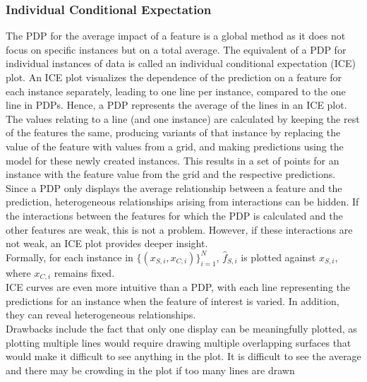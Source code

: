 \subsubsection*{Individual Conditional Expectation}
The PDP for the average impact of a feature is a global method as it does not focus on specific instances but on a total average. The equivalent of a PDP for individual instances of data is called an individual conditional expectation (ICE) plot. An ICE plot visualizes the dependence of the prediction on a feature for each instance separately, leading to one line per instance, compared to the one line in PDPs. Hence, a PDP represents the average of the lines in an ICE plot. The values relating to a line (and one instance) are calculated by keeping the rest of the features the same, producing variants of that instance by replacing the value of the feature with values from a grid, and making predictions using the model for these newly created instances. This results in a set of points for an instance with the feature value from the grid and the respective predictions. \\
Since a PDP only displays the average relationship between a feature and the prediction, heterogeneous relationships arising from interactions can be hidden. If the interactions between the features for which the PDP is calculated and the other features are weak, this is not a problem. However, if these interactions are not weak, an ICE plot provides deeper insight.\\
Formally, for each instance in $\lbrace\left(x_{S,i}, x_{C,i}\right)\rbrace_{i=1}^N$, $\widehat{f}_{S,i}$ is plotted against $x_{S,i}$, where $x_{C,i}$ remains fixed.\\
ICE curves are even more intuitive than a PDP, with each line representing the predictions for an instance when the feature of interest is varied. In addition, they can reveal heterogeneous relationships. \\
Drawbacks include the fact that only one display can be meaningfully plotted, as plotting multiple lines would require drawing multiple overlapping surfaces that would make it difficult to see anything in the plot. It is difficult to see the average and there may be crowding in the plot if too many lines are drawn \autocite[][]{goldstein2015peeking, molnar2020interpretable}
